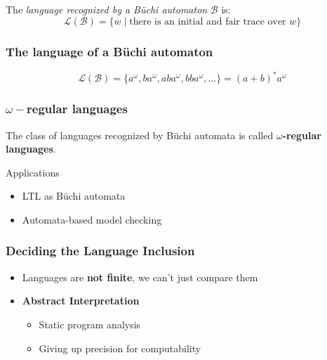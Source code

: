 \documentclass{beamer}
\newcommand{\Buchi}{B{\"u}chi}
\begin{document}
\begin{frame}
The \emph{language recognized by a \Buchi{} automaton} $\mathcal{B}$ is:
\[ \mathcal{L}(\mathcal{B}) = \{w \;|\; \textrm{there is an initial and fair trace over $w$} \} \]

\begin{example}
\frametitle{The language of a \Buchi{} automaton}
\begin{figure}[h]
\centering
{}
\end{figure}
\[ \mathcal{L}(\mathcal{B}) = \{a ^{\omega}, b a ^{\omega}, ab a^{\omega}, bb a^{\omega}, \dots\} = (a + b)^* a ^{\omega} \]
\end{example}

\end{frame}

\begin{frame}
\frametitle{$\omega-$regular languages}
\begin{definition}
The class of languages recognized by \Buchi{} automata is called
\textbf{$\omega$-regular languages}.
\end{definition}
Applications
\begin{itemize}
\item LTL as \Buchi{} automata
\item Automata-based model checking
\end{itemize}
\end{frame}

\begin{frame}
\frametitle{Deciding the Language Inclusion}
\begin{itemize}
\item Languages are \textbf{not finite}, we can't just compare them
\pause
\item \textbf{Abstract Interpretation}
    \begin{itemize}
    \item Static program analysis
    \item Giving up precision for computability
    \end{itemize}
\end{itemize}
\end{frame}
\end{document}
